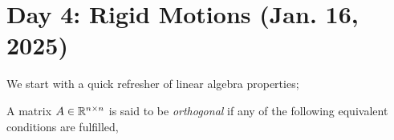 \section{Day 4: Rigid Motions (Jan. 16, 2025)}
We start with a quick refresher of linear algebra properties;
\begin{definition}
    A matrix $A \in \mathbb R^{n \times n}$ is said to be \textit{orthogonal} if any of the following equivalent conditions are fulfilled,
\end{definition}